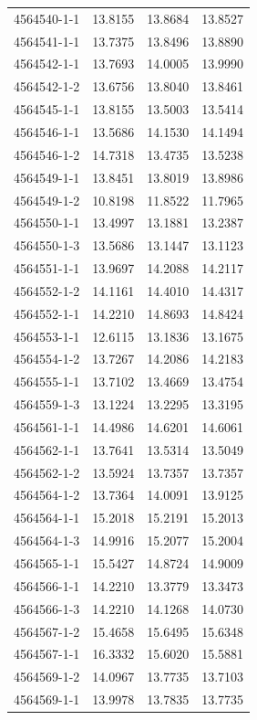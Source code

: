 \begin{longtable}{lrrr}
4564540-1-1 & 13.8155 & 13.8684 & 13.8527 \\
4564541-1-1 & 13.7375 & 13.8496 & 13.8890 \\
4564542-1-1 & 13.7693 & 14.0005 & 13.9990 \\
4564542-1-2 & 13.6756 & 13.8040 & 13.8461 \\
4564545-1-1 & 13.8155 & 13.5003 & 13.5414 \\
4564546-1-1 & 13.5686 & 14.1530 & 14.1494 \\
4564546-1-2 & 14.7318 & 13.4735 & 13.5238 \\
4564549-1-1 & 13.8451 & 13.8019 & 13.8986 \\
4564549-1-2 & 10.8198 & 11.8522 & 11.7965 \\
4564550-1-1 & 13.4997 & 13.1881 & 13.2387 \\
4564550-1-3 & 13.5686 & 13.1447 & 13.1123 \\
4564551-1-1 & 13.9697 & 14.2088 & 14.2117 \\
4564552-1-2 & 14.1161 & 14.4010 & 14.4317 \\
4564552-1-1 & 14.2210 & 14.8693 & 14.8424 \\
4564553-1-1 & 12.6115 & 13.1836 & 13.1675 \\
4564554-1-2 & 13.7267 & 14.2086 & 14.2183 \\
4564555-1-1 & 13.7102 & 13.4669 & 13.4754 \\
4564559-1-3 & 13.1224 & 13.2295 & 13.3195 \\
4564561-1-1 & 14.4986 & 14.6201 & 14.6061 \\
4564562-1-1 & 13.7641 & 13.5314 & 13.5049 \\
4564562-1-2 & 13.5924 & 13.7357 & 13.7357 \\
4564564-1-2 & 13.7364 & 14.0091 & 13.9125 \\
4564564-1-1 & 15.2018 & 15.2191 & 15.2013 \\
4564564-1-3 & 14.9916 & 15.2077 & 15.2004 \\
4564565-1-1 & 15.5427 & 14.8724 & 14.9009 \\
4564566-1-1 & 14.2210 & 13.3779 & 13.3473 \\
4564566-1-3 & 14.2210 & 14.1268 & 14.0730 \\
4564567-1-2 & 15.4658 & 15.6495 & 15.6348 \\
4564567-1-1 & 16.3332 & 15.6020 & 15.5881 \\
4564569-1-2 & 14.0967 & 13.7735 & 13.7103 \\
4564569-1-1 & 13.9978 & 13.7835 & 13.7735 \\

\end{longtable}
